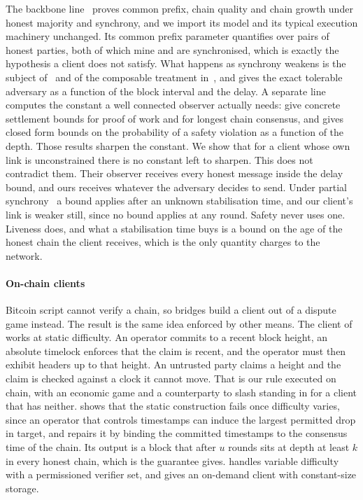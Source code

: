 The backbone line~\cite{gkl15,gkl24} proves common prefix, chain quality and
chain growth under honest majority and synchrony, and we import its model and
its typical execution machinery unchanged. Its common prefix parameter
quantifies over pairs of honest parties, both of which mine and are
synchronised, which is exactly the hypothesis a client does not satisfy. What
happens as synchrony weakens is the subject of~\cite{pss16,kp15} and of the
composable treatment in~\cite{bmtz17}, and \cite{dembo20} gives the exact
tolerable adversary as a function of the block interval and the delay. A
separate line computes the constant a well connected observer actually needs:
\cite{grr22,grr23} give concrete settlement bounds for proof of work and for
longest chain consensus, and \cite{guoren22} gives closed form bounds on the
probability of a safety violation as a function of the depth. Those results sharpen the constant. We show that for a client whose own link is
unconstrained there is no constant left to sharpen. This does not contradict
them. Their observer receives every honest message inside the delay bound, and
ours receives whatever the adversary decides to send. Under partial synchrony~\cite{dls88} a bound
applies after an unknown stabilisation time, and our client's link is weaker
still, since no bound applies at any round. Safety never uses one. Liveness
does, and what a stabilisation time buys is a bound on the age of the honest
chain the client receives, which is the only quantity 
charges to the network.

\paragraph{On-chain clients}

Bitcoin script cannot verify a chain, so bridges build a client out of a dispute
game instead. The result is the same idea enforced by other means. The client
of~\cite{bitvm2} works at static difficulty. An operator commits to a recent
block height, an absolute timelock enforces that the claim is recent, and the
operator must then exhibit headers up to that height. An untrusted party claims a height and the claim is checked against a clock it
cannot move. That is our rule executed on chain, with an economic game and a
counterparty to slash standing in for a client that has neither. \cite{bitvm3} shows that the static construction fails
once difficulty varies, since an operator that controls timestamps can induce
the largest permitted drop in target, and repairs it by binding the committed
timestamps to the consensus time of the chain. Its output is a block that after
$u$ rounds sits at depth at least $k$ in every honest chain, which is the
guarantee  gives. \cite{clementine} handles variable difficulty
with a permissioned verifier set, and \cite{glimpse} gives an on-demand client
with constant-size storage.
